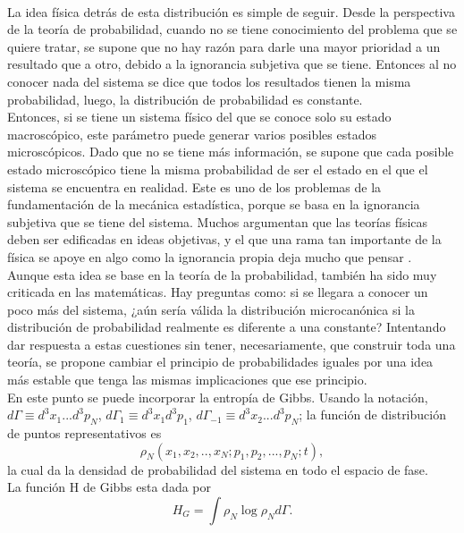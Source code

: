 \\
La idea física detrás de esta distribución es simple de seguir. Desde la perspectiva de la teoría de probabilidad, cuando no se tiene conocimiento del problema que se quiere tratar, se supone que no hay razón para darle una mayor prioridad a un resultado que a otro, debido a la ignorancia subjetiva que se tiene. Entonces al no conocer nada del sistema se dice que todos los resultados tienen la misma probabilidad, luego, la distribución de probabilidad es constante.
\\
Entonces, si se tiene un sistema físico del que se conoce solo su estado macroscópico, este parámetro puede generar varios posibles estados microscópicos. Dado que no se tiene más información, se supone que cada posible estado microscópico tiene la misma probabilidad de ser el estado en el que el sistema se encuentra en realidad. Este es uno de los problemas de la fundamentación de la mecánica estadística, porque se basa en la ignorancia subjetiva que se tiene del sistema. Muchos argumentan que las teorías físicas deben ser edificadas en ideas objetivas, y el que una rama tan importante de la física se apoye en algo como la ignorancia propia deja mucho que pensar \cite{Penrose}.
\\
Aunque esta idea se base en la teoría de la probabilidad, también ha sido muy criticada en las matemáticas. Hay preguntas como: si se llegara a conocer un poco más del sistema, ¿aún sería válida la distribución microcanónica si la distribución de probabilidad realmente es diferente a una constante? Intentando dar respuesta a estas cuestiones sin tener, necesariamente, que construir toda una teoría, se propone cambiar el principio de probabilidades iguales por una idea más estable que tenga las mismas implicaciones que ese principio.
\\
En este punto se puede incorporar la entropía de Gibbs. Usando la notación, $d\Gamma \equiv d^{3}x_{1}...d^{3}p_{N}$, $d\Gamma_{1} \equiv d^{3}x_{1}d^{3}p_{1}$, $d\Gamma_{-1} \equiv d^{3}x_{2}...d^{3}p_{N}$; la función de distribución de puntos representativos es
\begin{equation}
\rho_{N}(x_{1},x_{2},..,x_{N};p_{1},p_{2},...,p_{N};t),
\end{equation}
la cual da la densidad de probabilidad del sistema en todo el espacio de fase. 
\\
La función H de Gibbs esta dada por
\begin{equation}
H_{G}= \int \rho_{N} \log \rho_{N} d \Gamma.
\end{equation}
